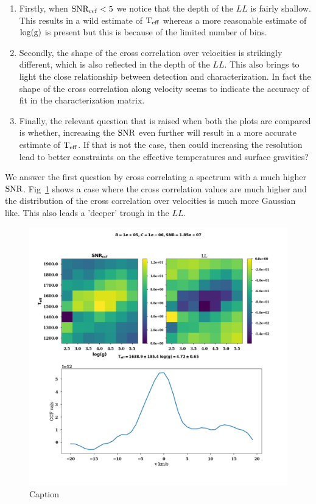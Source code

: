\begin{enumerate}
    \item Firstly, when $\rm{SNR_{ccf}}<5$ we notice that the depth of the $LL$ is fairly shallow. 
    This results in a wild estimate of $\rm{T_{eff}}$ whereas a more reasonable estimate of $\log(\rm{g})$ is present but this is because of the limited number of bins.
    \item Secondly, the shape of the cross correlation over velocities is strikingly different, which is also reflected in the depth of the $LL$.
    This also brings to light the close relationship between detection and characterization.
    In fact the shape of the cross correlation along velocity seems to indicate the accuracy of fit in the characterization matrix.
    \item Finally, the relevant question that is raised when both the plots are compared is whether, increasing the $\rm{SNR}$ even further will result in a more accurate estimate of $\rm{T_{eff}}$.
    If that is not the case, then could increasing the resolution lead to better constraints on the effective temperatures and surface gravities?
\end{enumerate}
We answer the first question by cross correlating a spectrum with a much higher $\rm{SNR}$.
Fig~\ref{fig:charmap-deeptrough} shows a case where the cross correlation values are much higher and the distribution of the cross correlation over velocities is much more Gaussian like.
This also leads a 'deeper' trough in the $LL$.
\begin{figure}[!ht]
    \centering
    \includegraphics[scale=0.3]{images/Chapter3/char_plots_1e+05_1e-06_1.85e+07.png}
    \caption{Caption}
    \label{fig:charmap-deeptrough}
\end{figure}
